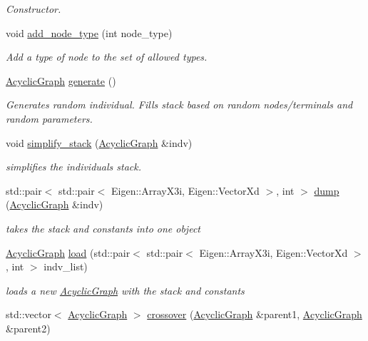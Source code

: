 \begin{DoxyCompactItemize}
\begin{DoxyCompactList}\small\item\em Constructor. \end{DoxyCompactList}\item 
void \hyperlink{classAcyclicGraphManipulator_aea284c38a894e8bd6a7d19f0c94ce6c1}{add\+\_\+node\+\_\+type} (int node\+\_\+type)
\begin{DoxyCompactList}\small\item\em Add a type of node to the set of allowed types. \end{DoxyCompactList}\item 
\hyperlink{classAcyclicGraph}{Acyclic\+Graph} \hyperlink{classAcyclicGraphManipulator_ade84b4ad6030e5b78026d252af9b38fa}{generate} ()
\begin{DoxyCompactList}\small\item\em Generates random individual. Fills stack based on random nodes/terminals and random parameters. \end{DoxyCompactList}\item 
void \hyperlink{classAcyclicGraphManipulator_af53180fce6c3aa0deeaa9db2d1877990}{simplify\+\_\+stack} (\hyperlink{classAcyclicGraph}{Acyclic\+Graph} \&indv)
\begin{DoxyCompactList}\small\item\em simplifies the individual\textquotesingle{}s stack. \end{DoxyCompactList}\item 
std\+::pair$<$ std\+::pair$<$ Eigen\+::\+Array\+X3i, Eigen\+::\+Vector\+Xd $>$, int $>$ \hyperlink{classAcyclicGraphManipulator_a25e1e62f422475fd78c2a9f9046190e2}{dump} (\hyperlink{classAcyclicGraph}{Acyclic\+Graph} \&indv)
\begin{DoxyCompactList}\small\item\em takes the stack and constants into one object \end{DoxyCompactList}\item 
\hyperlink{classAcyclicGraph}{Acyclic\+Graph} \hyperlink{classAcyclicGraphManipulator_af84d3a060598f93d6b0752e99d7df019}{load} (std\+::pair$<$ std\+::pair$<$ Eigen\+::\+Array\+X3i, Eigen\+::\+Vector\+Xd $>$, int $>$ indv\+\_\+list)
\begin{DoxyCompactList}\small\item\em loads a new \hyperlink{classAcyclicGraph}{Acyclic\+Graph} with the stack and constants \end{DoxyCompactList}\item 
std\+::vector$<$ \hyperlink{classAcyclicGraph}{Acyclic\+Graph} $>$ \hyperlink{classAcyclicGraphManipulator_a48cbf21ddadc69fd9122ad923532b105}{crossover} (\hyperlink{classAcyclicGraph}{Acyclic\+Graph} \&parent1, \hyperlink{classAcyclicGraph}{Acyclic\+Graph} \&parent2)

\end{DoxyCompactItemize}
